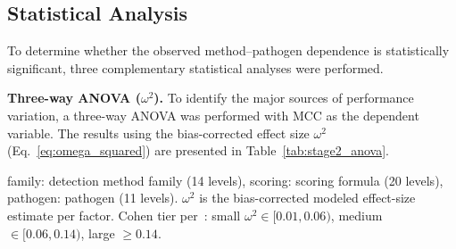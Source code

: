 \subsection{Statistical Analysis}
\label{subsec:9pathogen_statistical}

To determine whether the observed method--pathogen dependence is statistically significant, three complementary statistical analyses were performed.

\textbf{Three-way ANOVA ($\omega^2$).}
\label{subsec:9pathogen_anova}
To identify the major sources of performance variation, a three-way ANOVA was performed with MCC as the dependent variable.
The results using the bias-corrected effect size $\omega^2$ (Eq.~\ref{eq:omega_squared}) are presented in Table~\ref{tab:stage2_anova}.

\begin{table}[htbp]
\centering
\caption{Three-way ANOVA results: $\omega^2$ effect size of each modeled factor on MCC. The scoring $\times$ pathogen interaction ($\omega^2 = 0.296$) is the largest single modeled source of performance variance; a within-cell residual $\omega^2 \approx 0.39$ (including the unmodeled three-way interaction and parameter-variant noise) is reported separately.}
\label{tab:stage2_anova}
\begin{minipage}{\textwidth}
\smallskip
\footnotesize family: detection method family (14 levels), scoring: scoring formula (20 levels), pathogen: pathogen (11 levels). $\omega^2$ is the bias-corrected modeled effect-size estimate per factor. Cohen tier per~\cite{cohen1988statistical}: small $\omega^2 \in [0.01, 0.06)$, medium $\in [0.06, 0.14)$, large $\geq 0.14$.
\end{minipage}
\end{table}

